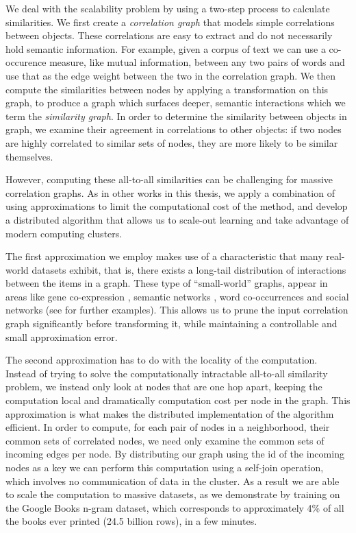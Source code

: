 \label{sec:concepts-method}

We deal with the scalability problem by using a two-step process to calculate similarities.
We first create a \emph{correlation graph} that models simple correlations between objects.
These correlations are easy to extract and do not necessarily hold semantic information.
For example,
given a corpus of text we can use a
co-occurence measure, like mutual information, between any two pairs of
words and use that as the edge weight between the two in the correlation graph.
We then compute the similarities between nodes by applying a transformation on this graph, to produce a graph which surfaces deeper,
semantic interactions which we term the \emph{similarity graph}.
In order to determine the similarity between objects in graph, we examine
their agreement in correlations to other objects: if two nodes are highly
correlated to similar sets of nodes, they are more likely to be similar themselves.

However, computing these all-to-all similarities can be challenging for massive
correlation graphs.
As in other works in this thesis, we apply a combination of using approximations to limit
the computational cost of the method, and develop a distributed algorithm that allows
us to scale-out learning and take advantage of modern computing clusters.

The first approximation we employ makes use of a characteristic that many real-world datasets exhibit,
that is, there exists a long-tail distribution of interactions between the items in a graph. These type
of ``small-world'' graphs, appear in areas like gene co-expression \cite{gene-small-world}, semantic networks \cite{semantic-small-world},
word co-occurrences \cite{words-small-world} and social networks (see \cite{barabasi-small-world} for further
examples).
This allows us to prune the input correlation graph significantly before transforming it,
while maintaining a controllable and small approximation error.

The second approximation has to do with the locality of the computation. Instead of trying
to solve the computationally intractable all-to-all similarity problem, we instead only look at
nodes that are one hop apart, keeping the computation local and dramatically computation cost per node in the graph.
This approximation is what makes the distributed implementation of the algorithm efficient.
In order to compute, for each pair of nodes in a neighborhood, their common sets of correlated nodes,
we need only examine the common sets of incoming edges per node. By distributing our graph
using the id of the incoming nodes as a key we can perform this computation using a
self-join operation, which involves no communication of data in the cluster. As a result
we are able to scale the computation to massive datasets, as we demonstrate by training on the
Google Books n-gram dataset, which corresponds to approximately 4\% of all the books ever
printed \cite{ngrams} (24.5 billion rows), in a few minutes.

